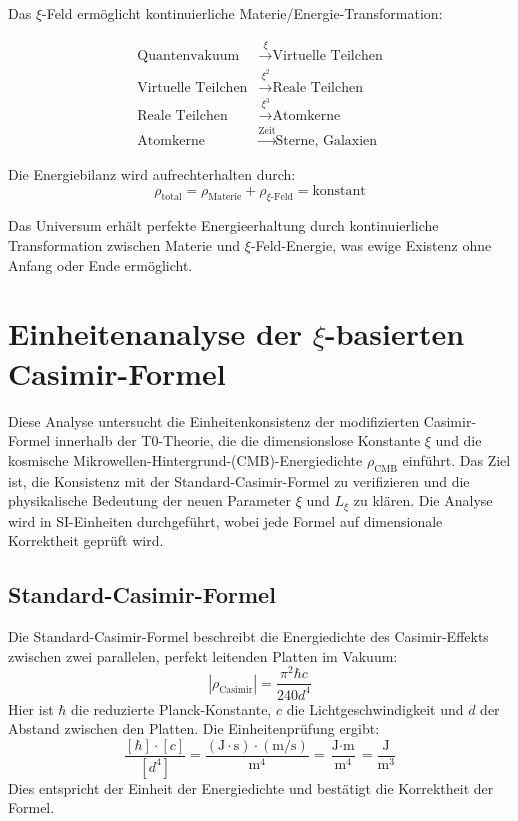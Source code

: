 	Das $\xi$-Feld ermöglicht kontinuierliche Materie/Energie-Transformation:
	
	\begin{align}
		\text{Quantenvakuum} &\xrightarrow{\xi} \text{Virtuelle Teilchen} \\
		\text{Virtuelle Teilchen} &\xrightarrow{\xi^2} \text{Reale Teilchen} \\
		\text{Reale Teilchen} &\xrightarrow{\xi^3} \text{Atomkerne} \\
		\text{Atomkerne} &\xrightarrow{\text{Zeit}} \text{Sterne, Galaxien}
	\end{align}
	
	Die Energiebilanz wird aufrechterhalten durch:
	\begin{equation}
		\rho_{\text{total}} = \rho_{\text{Materie}} + \rho_{\xi\text{-Feld}} = \text{konstant}
	\end{equation}
	
	\begin{important}
		Das Universum erhält perfekte Energieerhaltung durch kontinuierliche Transformation zwischen Materie und $\xi$-Feld-Energie, was ewige Existenz ohne Anfang oder Ende ermöglicht.
	\end{important}
	
	\section{Einheitenanalyse der $\xi$-basierten Casimir-Formel}
	
	Diese Analyse untersucht die Einheitenkonsistenz der modifizierten Casimir-Formel innerhalb der T0-Theorie, die die dimensionslose Konstante $\xi$ und die kosmische Mikrowellen-Hintergrund-(CMB)-Energiedichte $\rho_{\text{CMB}}$ einführt. Das Ziel ist, die Konsistenz mit der Standard-Casimir-Formel zu verifizieren und die physikalische Bedeutung der neuen Parameter $\xi$ und $L_\xi$ zu klären. Die Analyse wird in SI-Einheiten durchgeführt, wobei jede Formel auf dimensionale Korrektheit geprüft wird.
	
	\subsection{Standard-Casimir-Formel}
	Die Standard-Casimir-Formel beschreibt die Energiedichte des Casimir-Effekts zwischen zwei parallelen, perfekt leitenden Platten im Vakuum:
	\begin{equation}
		|\rho_{\text{Casimir}}| = \frac{\pi^2 \hbar c}{240 d^4}
	\end{equation}
	Hier ist $\hbar$ die reduzierte Planck-Konstante, $c$ die Lichtgeschwindigkeit und $d$ der Abstand zwischen den Platten. Die Einheitenprüfung ergibt:
	\begin{equation}
		\frac{[\hbar] \cdot [c]}{[d^4]} = \frac{(\text{J} \cdot \text{s}) \cdot (\text{m}/\text{s})}{\text{m}^4} = \frac{\text{J} \cdot \text{m}}{\text{m}^4} = \frac{\text{J}}{\text{m}^3}
	\end{equation}
	Dies entspricht der Einheit der Energiedichte und bestätigt die Korrektheit der Formel.
	
